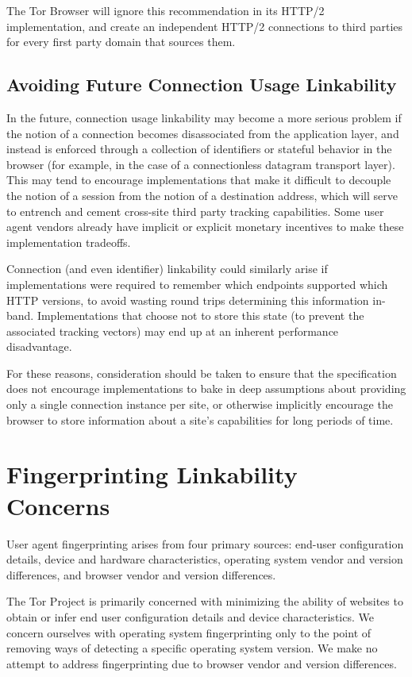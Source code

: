\documentclass[letterpaper,11pt]{llncs}
\begin{document}
The Tor Browser will ignore this recommendation in its HTTP/2 implementation,
and create an independent HTTP/2 connections to third parties for every first
party domain that sources them.

\subsection{Avoiding Future Connection Usage Linkability}

In the future, connection usage linkability may become a more serious problem
if the notion of a connection becomes disassociated from the application
layer, and instead is enforced through a collection of identifiers or stateful
behavior in the browser (for example, in the case of a connectionless datagram
transport layer). This may tend to encourage implementations that make it
difficult to decouple the notion of a session from the notion of a destination
address, which will serve to entrench and cement cross-site third party
tracking capabilities. Some user agent vendors already have implicit or
explicit monetary incentives to make these implementation tradeoffs.

Connection (and even identifier) linkability could similarly arise if
implementations were required to remember which endpoints supported which HTTP
versions, to avoid wasting round trips determining this information in-band.
Implementations that choose not to store this state (to prevent the associated
tracking vectors) may end up at an inherent performance disadvantage.

For these reasons, consideration should be taken to ensure that the
specification does not encourage implementations to bake in deep assumptions
about providing only a single connection instance per site, or otherwise
implicitly encourage the browser to store information about a site's
capabilities for long periods of time.

\section{Fingerprinting Linkability Concerns}

User agent fingerprinting arises from four primary sources: end-user
configuration details, device and hardware characteristics, operating system
vendor and version differences, and browser vendor and version differences.

The Tor Project is primarily concerned with minimizing the ability of websites
to obtain or infer end user configuration details and device characteristics.
We concern ourselves with operating system fingerprinting only to the point of
removing ways of detecting a specific operating system version. We make no
attempt to address fingerprinting due to browser vendor and version
differences\cite{torbrowser-fingerprinting}.
\end{document}
